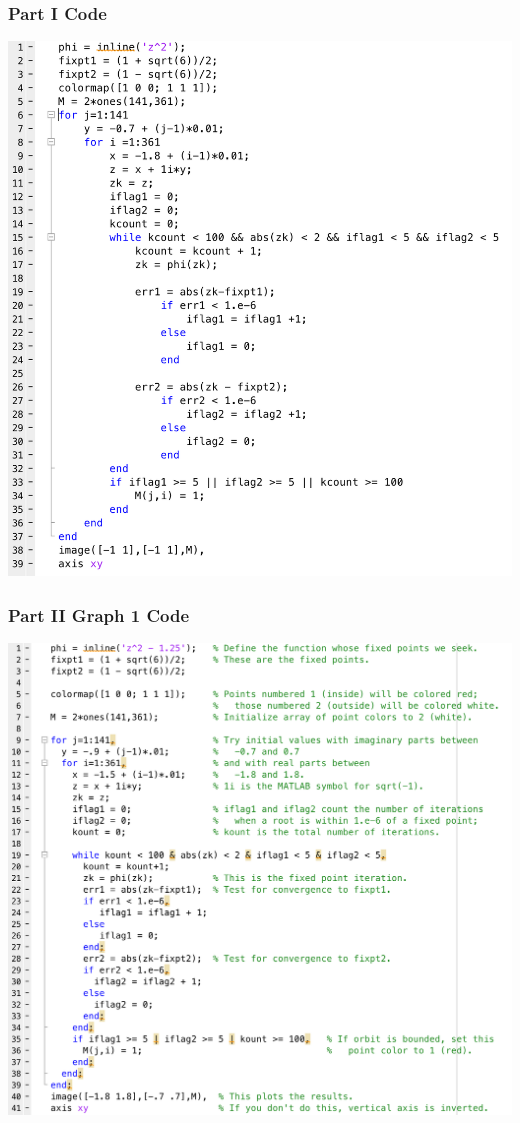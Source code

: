 \documentclass[11pt]{article}
\theoremstyle{plain}
\theoremstyle{definition}
\begin{document}
\subsubsection*{Part I Code}
\includegraphics*[scale = 0.35]{Part1Code.png}
\subsubsection*{Part II Graph 1 Code}
\includegraphics*[scale = 0.35]{Part2aCode.png}
\end{document}
